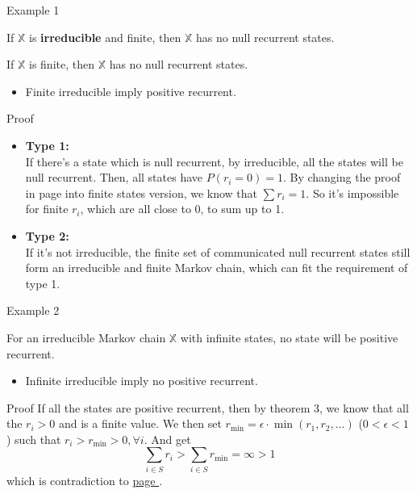 \documentclass{beamer}
\begin{document}
\begin{frame}{Example 1}\label{finite_pos_rec}
	\begin{example}[type 1]
	If $\mathbb{X}$ is \textbf{irreducible} and finite, then $\mathbb{X}$ has no null recurrent states.
	\end{example}
	\begin{example}[type 2]
	If $\mathbb{X}$ is finite, then $\mathbb{X}$ has no null recurrent states.
	\end{example}
	\begin{itemize}
	\item Finite irreducible imply positive recurrent.
	\end{itemize}
\end{frame}

\begin{frame}{Proof}
	\begin{itemize}
	\item \textbf{Type 1:}\\
		If there's a state which is null recurrent, by irreducible, all the states will be null recurrent.
		Then, all states have $P(r_i = 0) = 1$.
		By changing the proof in page \pageref{proportion_sum} into finite states version, 
		we know that $\sum r_i = 1$.
		So it's impossible for finite $r_i$, which are all close to 0, to sum up to 1.
	\item \textbf{Type 2:}\\
		If it's not irreducible, the finite set of communicated null recurrent states still form an irreducible and finite Markov chain, which can fit the requirement of type 1.
	\end{itemize}
\end{frame}

\begin{frame}{Example 2}
	\begin{example}
	For an irreducible Markov chain $\mathbb{X}$ with infinite states, no state will be positive recurrent.
	\end{example}
	\begin{itemize}
	\item Infinite irreducible imply no positive recurrent.
	\end{itemize}
\end{frame}

\begin{frame}{Proof}
	If all the states are positive recurrent, then by theorem 3, 
	we know that all the $r_i > 0$ and is a finite value.
	We then set $r_\text{min} = \epsilon\cdot \min (r_1, r_2, \ldots)$ ($0 < \epsilon < 1$) such that 
	$r_i > r_\text{min} > 0, \forall i$.
	And get
	\[
	\sum_{i\in S} r_i > \sum_{i\in S} r_\text{min} = \infty > 1
	\]
	which is contradiction to \hyperlink{proportion_sum}{page \pageref{proportion_sum}}.
\end{frame}
\end{document}
